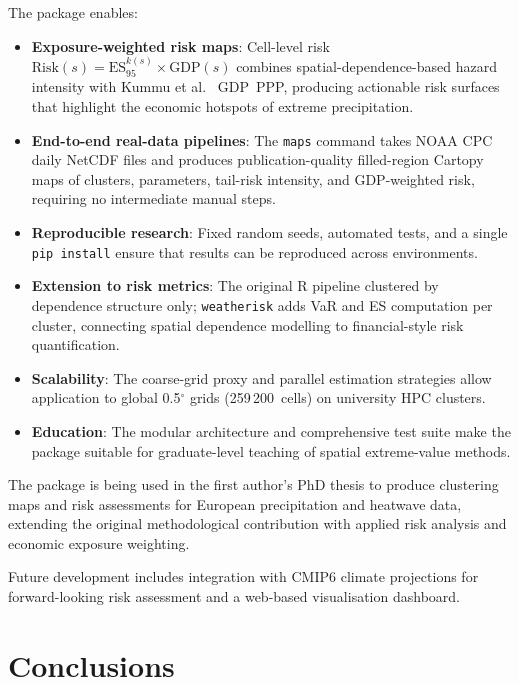 \documentclass[a4paper]{elsarticle}
\begin{document}
The package enables:

\begin{itemize}
\item \textbf{Exposure-weighted risk maps}: Cell-level risk
  $\mathrm{Risk}(s) = \mathrm{ES}_{95}^{k(s)} \times \mathrm{GDP}(s)$
  combines spatial-dependence-based hazard intensity with Kummu et
  al.~\cite{kummu2018} GDP~PPP, producing actionable risk surfaces
  that highlight the economic hotspots of extreme precipitation.
\item \textbf{End-to-end real-data pipelines}: The \texttt{maps} command
  takes NOAA CPC daily NetCDF files and produces publication-quality
  filled-region Cartopy maps of clusters, parameters, tail-risk
  intensity, and GDP-weighted risk, requiring no intermediate manual steps.
\item \textbf{Reproducible research}: Fixed random seeds, automated tests,
  and a single \texttt{pip install} ensure that results can be
  reproduced across environments.
\item \textbf{Extension to risk metrics}: The original R pipeline clustered
  by dependence structure only; \texttt{weatherisk} adds VaR and ES
  computation per cluster, connecting spatial dependence modelling to
  financial-style risk quantification.
\item \textbf{Scalability}: The coarse-grid proxy and parallel estimation
  strategies allow application to global 0.5$^\circ$ grids (259\,200~cells)
  on university HPC clusters.
\item \textbf{Education}: The modular architecture and comprehensive test suite
  make the package suitable for graduate-level teaching of spatial
  extreme-value methods.
\end{itemize}

The package is being used in the first author's PhD thesis to produce
clustering maps and risk assessments for European precipitation and
heatwave data, extending the original methodological contribution with
applied risk analysis and economic exposure weighting.

Future development includes integration with CMIP6 climate projections
for forward-looking risk assessment and a web-based visualisation dashboard.

\section{Conclusions}
\label{sec:conclusions}
\end{document}

